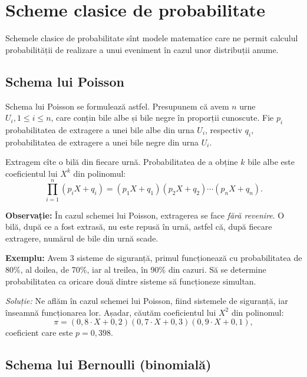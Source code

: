 
\chapter{Scheme clasice de probabilitate}

Schemele clasice de probabilitate sînt modele matematice care ne permit calculul
probabilității de realizare a unui eveniment în cazul unor distribuții anume.

\section{Schema lui Poisson}

\indent\indent Schema lui Poisson se formulează astfel. Presupunem că avem $ n $
urne $ U_i, 1 \leq i \leq n $, care conțin bile albe și bile negre în proporții
cunoscute. Fie $ p_i $ probabilitatea de extragere a unei bile albe din urna $ U_i $,
respectiv $ q_i $, probabilitatea de extragere a unei bile negre din urna $ U_i $.

Extragem cîte o bilă din fiecare urnă. Probabilitatea de a obține $ k $ bile albe
este coeficientul lui $ X^k $ din polinomul:
\[
  \prod_{i = 1}^n (p_i X + q_i) = (p_1 X + q_1) (p_2 X + q_2) \cdots (p_n X + q_n).
\]

\textbf{Observație:} În cazul schemei lui Poisson, extragerea se face \emph{fără %
  revenire}. O bilă, după ce a fost extrasă, nu este repusă în urnă, astfel că, după
fiecare extragere, numărul de bile din urnă scade.

\vspace{0.3cm}

\textbf{Exemplu:} Avem 3 sisteme de siguranță, primul funcționează cu probabilitatea
de 80\%, al doilea, de 70\%, iar al treilea, în 90\% din cazuri. Să se determine
probabilitatea ca oricare două dintre sisteme să funcționeze simultan.

\emph{Soluție:} Ne aflăm în cazul schemei lui Poisson,  fiind sistemele
de siguranță, iar  înseamnă funcționarea lor. Așadar, căutăm
coeficientul lui $ X^2 $ din polinomul:
\[
  \pi = (0,8 \cdot X + 0,2)(0,7 \cdot X + 0,3)(0,9 \cdot X + 0,1),
\]
coeficient care este $ p = 0,398 $.


\section{Schema lui Bernoulli (binomială)}

